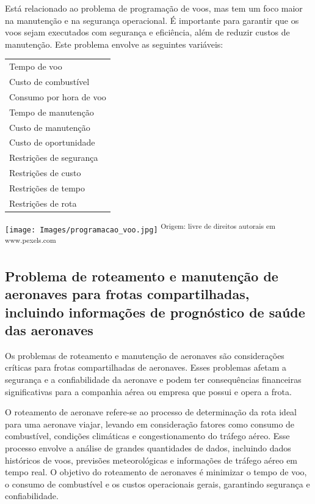 \documentclass{article}
\begin{document}
Está relacionado ao problema de programação de voos, mas tem um foco maior na manutenção e na segurança operacional. É importante para garantir que os voos sejam executados com segurança e eficiência, além de reduzir custos de manutenção. Este problema envolve as seguintes variáveis:


\begin{minipage}[h]{.98\linewidth}
	\begin{minipage}[t]{0.33\linewidth}
		\begin{tabular}{l}\hline
		Tempo de voo\\
		Custo de combustível\\
		Consumo por hora de voo\\
		Tempo de manutenção\\
		Custo de manutenção\\
		Custo de oportunidade\\
		Restrições de segurança\\
		Restrições de custo\\
		Restrições de tempo\\
		Restrições de rota\\
		\end{tabular}
	\end{minipage}
	\hfill
	\begin{minipage}[t]{0.53\linewidth}
		\vspace{-2ex}
		\texttt{[image: Images/programacao\_voo.jpg]}
		\small\textsuperscript{Origem: livre de direitos autorais em www.pexels.com}
	\end{minipage}
\end{minipage}



\subsection{Problema de roteamento e manutenção de aeronaves para frotas compartilhadas, incluindo informações de prognóstico de saúde das aeronaves}

Os problemas de roteamento e manutenção de aeronaves são considerações críticas para frotas compartilhadas de aeronaves. Esses problemas afetam a segurança e a confiabilidade da aeronave e podem ter consequências financeiras significativas para a companhia aérea ou empresa que possui e opera a frota.

O roteamento de aeronave refere-se ao processo de determinação da rota ideal para uma aeronave viajar, levando em consideração fatores como consumo de combustível, condições climáticas e congestionamento do tráfego aéreo. Esse processo envolve a análise de grandes quantidades de dados, incluindo dados históricos de voos, previsões meteorológicas e informações de tráfego aéreo em tempo real. O objetivo do roteamento de aeronaves é minimizar o tempo de voo, o consumo de combustível e os custos operacionais gerais, garantindo segurança e confiabilidade.
\end{document}
